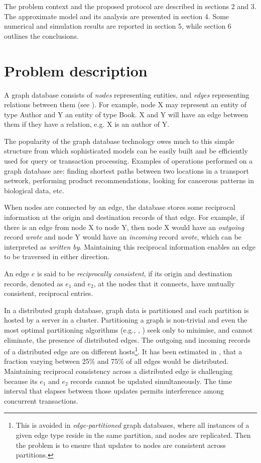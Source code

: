 \documentclass[runningheads]{llncs}
\begin{document}
The problem context and the proposed protocol are described in sections 2 and 3.
The approximate model and its analysis are presented in section 4. Some
numerical and simulation results are reported in section 5, while section 6
outlines the conclusions.

\section{Problem description}

A graph database consists of {\em nodes} representing entities, and {\em edges}
representing relations between them (see \cite{rob}). For example,
node X may represent an entity of type \textsf{Author} and Y an entity of type
\textsf{Book}. X and Y will have an edge between them if they have a relation,
e.g. X is an author of Y.

The popularity of the graph database technology owes much to this simple
structure from which sophisticated models can be easily built and be
efficiently used for query or transaction processing. Examples of
operations performed on a graph database are: finding shortest paths between
two locations in a transport network, performing product recommendations,
looking for cancerous patterns in biological data, etc.

When nodes are connected by an edge, the database stores some reciprocal
information at the origin and destination records of that edge. For example,
if there is an edge from node X to node Y, then node X would have an {\em outgoing}
record {\em wrote} and node Y would have an {\em incoming} record {\em wrote},
which can be interpreted as {\em written by}. Maintaining this reciprocal information
enables an edge to be traversed in either direction.

An edge $e$ is said to be \textit{reciprocally consistent}, if its
origin and destination records, denoted as $e_1$ and $e_2$, at the nodes
that it connects, have mutually consistent, reciprocal entries.

In a distributed graph database, graph data is partitioned and each partition is hosted
by a server in a cluster. Partitioning a graph is non-trivial and even the most optimal
partitioning algorithms (e.g., \cite{hua}, \cite{fir}) seek only to minimise, and cannot
eliminate, the presence of distributed edges. The outgoing and incoming records of a
distributed edge are on different hosts\footnote[1]{This is avoided in {\em edge-partitioned}
graph databases, where all instances of a given edge type reside in the same partition, and nodes
are replicated. Then the problem is to ensure that updates to nodes are consistent across partitions.}.
It has been estimated in \cite{sta}, that a
fraction varying between 25\% and 75\% of all edges would be distributed. Maintaining
reciprocal consistency across a distributed edge is challenging because its $e_1$ and $e_2$
records cannot be updated simultaneously. The time interval that elapses between those updates
permits interference among concurrent transactions.
\end{document}
